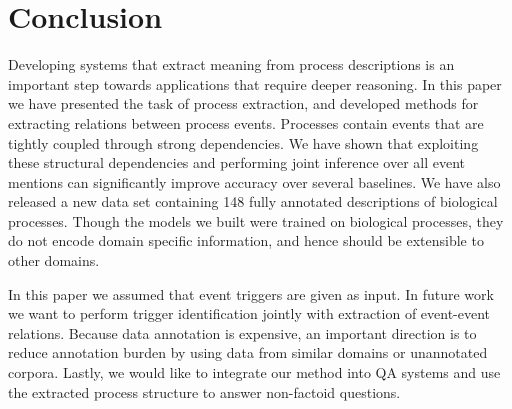 \section{Conclusion}

Developing systems that extract meaning from process descriptions is an important step towards applications that require deeper reasoning. In this paper we have presented the task of process extraction, and developed methods for extracting relations between process events. Processes contain events that are  tightly coupled through strong dependencies. We have shown that  exploiting these structural dependencies and performing joint inference over all event mentions can significantly improve accuracy over several baselines. We have also released a new data set containing 148 fully annotated descriptions of biological processes. Though the models we built were trained on biological processes, they do not encode domain specific information, and hence should be extensible to other domains.

In this paper we assumed that event triggers are given as input. In future work we want to perform trigger identification jointly with extraction of event-event relations. Because data annotation is expensive, an important direction is to reduce annotation burden by using data from similar domains or unannotated corpora. Lastly, we would like to integrate our method into QA systems and use the extracted process structure to answer non-factoid questions. 
